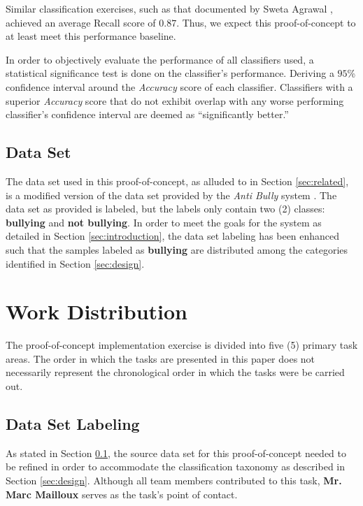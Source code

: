 \documentclass[conference]{sig-alternate-05-2015}
\begin{document}
Similar classification exercises, such as that documented by Sweta Agrawal
\cite{agrawal2018deep}, achieved an average Recall score of \( 0.87 \). Thus,
we expect this proof-of-concept to at least meet this performance baseline.

In order to objectively evaluate the performance of all classifiers used, a
statistical significance test is done on the classifier's performance. Deriving
a $95$\% confidence interval around the \textit{Accuracy} score of each
classifier. Classifiers with a superior \textit{Accuracy} score that do not
exhibit overlap with any worse performing classifier's confidence interval are
deemed as ``significantly better.''

\subsection{Data Set}\label{sec:dataset}
The data set used in this proof-of-concept, as alluded to in Section
\ref{sec:related}, is a modified version of the data set provided by the
\textit{Anti Bully} system \cite{Li2016}. The data set as provided is labeled,
but the labels only contain two (2) classes: \textbf{bullying} and
\textbf{not bullying}. In order to meet the goals for the system as detailed in
Section \ref{sec:introduction}, the data set labeling has been
enhanced such that the samples labeled as \textbf{bullying} are distributed
among the categories identified in Section \ref{sec:design}.

\section{Work Distribution}\label{sec:plan_roles}
The proof-of-concept implementation exercise is divided into five (5)
primary task areas. The order in which the tasks are presented in this paper
does not necessarily represent the chronological order in which the tasks were
be carried out.

\subsection{Data Set Labeling}\label{sec:labeling_task}
As stated in Section \ref{sec:dataset}, the source data set for this
proof-of-concept needed to be refined in order to accommodate the
classification taxonomy as described in Section \ref{sec:design}. Although all
team members contributed to this task, \textbf{Mr. Marc Mailloux} serves as the
task's point of contact.
\end{document}
